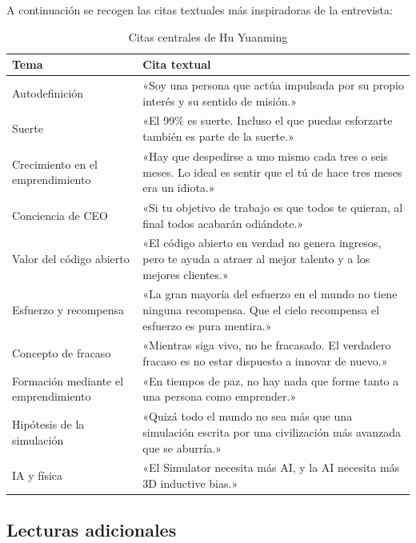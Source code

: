 A continuación se recogen las citas textuales más inspiradoras de la entrevista:

\begin{table}[H]
\centering
\caption{Citas centrales de Hu Yuanming}
\begin{tabular}{p{3.5cm}p{10cm}}
\toprule
\textbf{Tema} & \textbf{Cita textual} \\
\midrule
Autodefinición & «Soy una persona que actúa impulsada por su propio interés y su sentido de misión.» \\
\midrule
Suerte & «El 99\% es suerte. Incluso el que puedas esforzarte también es parte de la suerte.» \\
\midrule
Crecimiento en el emprendimiento & «Hay que despedirse a uno mismo cada tres o seis meses. Lo ideal es sentir que el tú de hace tres meses era un idiota.» \\
\midrule
Conciencia de CEO & «Si tu objetivo de trabajo es que todos te quieran, al final todos acabarán odiándote.» \\
\midrule
Valor del código abierto & «El código abierto en verdad no genera ingresos, pero te ayuda a atraer al mejor talento y a los mejores clientes.» \\
\midrule
Esfuerzo y recompensa & «La gran mayoría del esfuerzo en el mundo no tiene ninguna recompensa. Que el cielo recompensa el esfuerzo es pura mentira.» \\
\midrule
Concepto de fracaso & «Mientras siga vivo, no he fracasado. El verdadero fracaso es no estar dispuesto a innovar de nuevo.» \\
\midrule
Formación mediante el emprendimiento & «En tiempos de paz, no hay nada que forme tanto a una persona como emprender.» \\
\midrule
Hipótesis de la simulación & «Quizá todo el mundo no sea más que una simulación escrita por una civilización más avanzada que se aburría.» \\
\midrule
IA y física & «El Simulator necesita más AI, y la AI necesita más 3D inductive bias.» \\
\bottomrule
\end{tabular}
\end{table}

\subsection{Lecturas adicionales}

